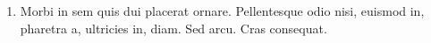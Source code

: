 \documentclass[a4paper]{article}
\newcommand{\hide}[1]
{}
\begin{document}
\begin{multicols}{3}
\begin{enumerate}[leftmargin=0.3cm]
    \item{Morbi in sem quis dui placerat ornare. Pellentesque odio nisi, euismod in, pharetra a, ultricies in, diam. Sed arcu. Cras consequat.} %
  \end{enumerate}
\end{multicols}

\hide{
}
\end{document}
